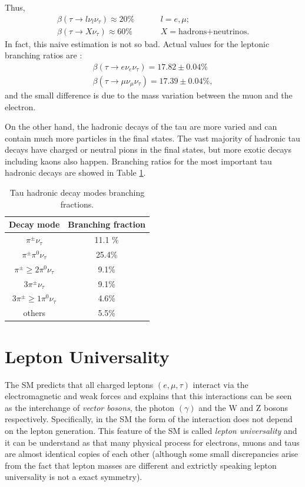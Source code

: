 Thus, 
\begin{align}
\beta(\tau\to l\nu_l\nu_\tau)\approx 20\%& \hspace{1cm}l=e,\mu;
\\
\beta(\tau\to X\nu_\tau)\approx 60\%& \hspace{1cm} X=\text{hadrons+neutrinos}.
\end{align}
In fact, this naive estimation is not so bad. Actual values for the leptonic branching ratios are \cite{PhysRevD.98.030001}:
\begin{align}
\beta(\tau\to e\nu_e\nu_\tau)=17.82\pm 0.04\%
\label{eq6}
\\
\beta(\tau\to \mu\nu_\mu\nu_\tau)=17.39\pm 0.04\%,
\end{align}
and the small difference is due to the mass variation between the muon and the electron.

On the other hand, the hadronic decays of the tau are more varied and can contain much more particles in the final states. The vast majority of hadronic tau decays have charged or neutral pions in the final states, but more exotic decays including kaons also happen. Branching ratios for the most important tau hadronic decays are showed in Table \ref{Table1}.
\begin{table}[]
	\centering
\begin{tabular}{|c|c|}
	\hline
	Decay mode                     & Branching fraction \\ \hline
	$\pi^\pm \nu_\tau$             & 11.1 \%            \\ \hline
	$\pi^\pm \pi^0 \nu_\tau$       & 25.4\%             \\ \hline
	$\pi^\pm \geq 2\pi^0 \nu_\tau$ & 9.1\%               \\ \hline
	$3\pi^\pm \nu_\tau$            & 9.1\%               \\ \hline
	$3\pi^\pm \geq 1\pi^0 \nu_\tau$& 4.6\%               \\ \hline
	others						   & 5.5\%               \\ \hline
\end{tabular}
	\caption{Tau hadronic decay modes branching fractions.}
	\label{Table1}
\end{table}
\section{Lepton Universality}
The SM predicts that all charged leptons $(e,\mu,\tau)$ interact via the electromagnetic and weak forces and explains that this interactions can be seen as the interchange of \textit{vector bosons}, the photon $(\gamma)$ and the W and Z bosons respectively. Specifically, in the SM the form of the interaction does not depend on the lepton generation. This feature of the SM is called \textit{lepton universality} and it can be understand as that many physical process for electrons, muons and taus are almost identical copies of each other (although some small discrepancies arise from the fact that lepton masses are different and extrictly speaking lepton universality is not a exact symmetry). 

